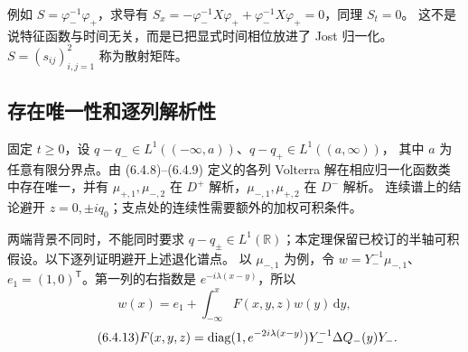 \documentclass[lang=cn,scheme=chinese,mode=simple,device=normal,color=blue,
math=cm,thmcnt=section,12pt]{elegantbook}
\newcommand{\dd}{\,\mathrm{d}}
\newcommand{\eqq}[2]{\tag{#1}\label{eq:#1}#2}
\begin{document}
例如 $S=\varphi_-^{-1}\varphi_+$，求导有
$S_x=-\varphi_-^{-1}X\varphi_++\varphi_-^{-1}X\varphi_+=0$，同理 $S_t=0$。
这不是说特征函数与时间无关，而是已把显式时间相位放进了 Jost 归一化。
$S=(s_{ij})_{i,j=1}^2$ 称为散射矩阵。

\subsection{存在唯一性和逐列解析性}
\setcounter{theorem}{0}
\begin{theorem}
    固定 $t\ge0$，设 $q-q_-\in L^1((-\infty,a))$、$q-q_+\in L^1((a,\infty))$，
    其中 $a$ 为任意有限分界点。由 (6.4.8)--(6.4.9) 定义的各列 Volterra 解在相应归一化函数类中存在唯一，并有
    $\mu_{+,1},\mu_{-,2}$ 在 $D^+$ 解析，$\mu_{-,1},\mu_{+,2}$ 在 $D^-$ 解析。
    连续谱上的结论避开 $z=0,\pm iq_0$；支点处的连续性需要额外的加权可积条件。
\end{theorem}

两端背景不同时，不能同时要求 $q-q_\pm\in L^1(\mathbb R)$；本定理保留已校订的半轴可积假设。以下逐列证明避开上述退化谱点。
以 $\mu_{-,1}$ 为例，令 $w=Y_-^{-1}\mu_{-,1}$、$e_1=(1,0)^{\mathsf T}$。第一列的右指数是 $e^{-i\lambda(x-y)}$，所以
\begin{equation}\eqq{6.4.12}{w(x)=e_1+\int_{-\infty}^x F(x,y,z)w(y)\dd y,}\end{equation}
\begin{equation}\eqq{6.4.13}{F(x,y,z)=\diag(1,e^{-2i\lambda(x-y)})Y_-^{-1}\Delta Q_-(y)Y_-.}\end{equation}
\end{document}
